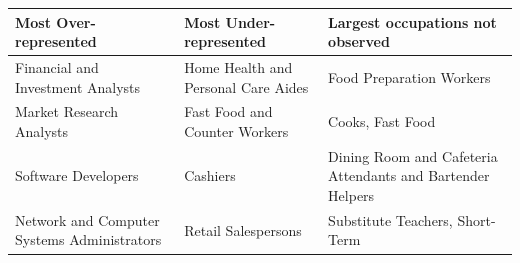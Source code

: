 \begin{tabularx}{\textwidth}{@{} L L L @{}}
\toprule
\textmd{Most Over-represented } & 
\textmd{Most Under-represented } & 
\textmd{Largest occupations not observed} \\
\midrule
Financial and Investment Analysts & 
Home Health and Personal Care Aides & 
Food Preparation Workers \\[0.6em]

Market Research Analysts & 
Fast Food and Counter Workers & 
Cooks, Fast Food \\[0.6em]

Software Developers & 
Cashiers & 
Dining Room and Cafeteria Attendants and Bartender Helpers \\[0.6em]

Network and Computer Systems Administrators & 
Retail Salespersons & 
Substitute Teachers, Short-Term \\
\bottomrule
\end{tabularx}
